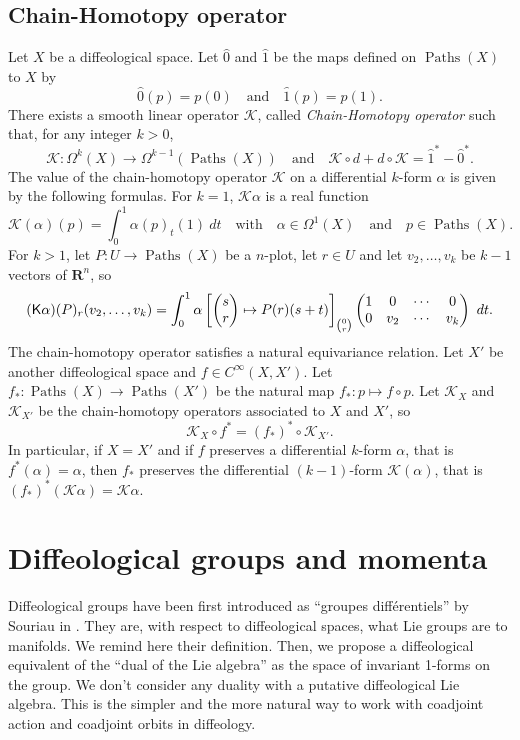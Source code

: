 \documentclass[10pt,reqno,twoside]{amsart}
\newcommand{\qmbox}[1]{\quad\mbox{#1}\quad}
\newcommand{\mymatrix}[1]{\begin{pmatrix} #1 \end{pmatrix}}
\newcommand{\RR}{\mathbf{R}}
\newcommand{\cK}{\mathcal{K}}
\DeclareMathOperator{\Paths}{Paths}
\newcommand{\Cinfty}{C^\infty}
\newcommand{\but}{\hat{1}}
\newcommand{\source}{\hat{0}}
\newcommand{\eK}{\mathbf{\sf K}}
\theoremstyle{plain}
\theoremstyle{definition}
\newcommand{\article}[1]{\subsection{#1}}
\begin{document}
  \article{Chain-Homotopy operator}
  \label{Chain-Homotopy-operator}
  Let $X$ be a diffeological space.
  Let $\source$ and $\but$ be the maps defined on $\Paths(X)$ to $X$ by
  $$\source(p) = p(0) \qmbox{and} \but(p) = p(1).$$
  There exists a smooth linear operator $\cK$,
  called {\em Chain-Homotopy operator} such that,
  for any integer $k>0$,
  $$
    \cK : \Omega^k(X) \to \Omega^{k-1}(\Paths(X))
    \qmbox{and} \cK \circ d + d \circ \cK = \but^* - \source^*.
    $$
  The value of the chain-homotopy operator $\cK$ on a differential $k$-form $\alpha$ is given by the following formulas.
  For $k = 1$,
  $\cK\alpha$ is a real function
  $$
    \cK(\alpha)(p) = \int_0^1 \alpha(p)_t(1) \ dt
    \qmbox{with} \alpha \in \Omega^1(X) \qmbox{and} p \in \Paths(X).
    $$
  For $k>1$,
  let $P : U \to \Paths(X)$ be a $n$-plot,
  let $r \in U$ and let $v_2,\ldots,v_{k}$ be $k-1$ vectors of $\RR^n$,
  so
  $$
    (\eK\alpha)(P)_r(v_2, \ldots,v_{k}) =
    \int_0^1 \alpha \left[ \mymatrix{s \cr r} \mapsto P (r)(s
    + t) \right]_{0 \choose r}\mymatrix{1 & 0 &
    \cdots & 0 \cr 0 & v_2 & \cdots & v_{k}} \
    dt.
    $$
  The chain-homotopy operator satisfies a natural equivariance relation.
  Let $X'$ be another diffeological space and $f \in \Cinfty(X,X')$.
  Let $f_* : \Paths(X) \to \Paths(X')$ be the natural map $f_* : p \mapsto f \circ p$.
  Let $\cK_X$ and $\cK_{X'}$ be the chain-homotopy operators associated to $X$ and $X'$,
  so
  $$
    \cK_X \circ f^* = (f_*)^* \circ \cK_{X'}.
    $$
  In particular,
  if $X = X'$ and if $f$ preserves a differential $k$-form $\alpha$,
  that is $f^*(\alpha) = \alpha$,
  then $f_*$ preserves the differential $(k-1)$-form $\cK(\alpha)$,
  that is $(f_*)^*(\cK\alpha) = \cK\alpha$.
  
  \section{Diffeological groups and momenta}
  
  Diffeological groups have been first introduced as ``groupes différentiels'' by Souriau in \cite{Sou81} \cite{Sou84}.
  They are,
  with respect to diffeological spaces,
  what Lie groups are to manifolds.
  We remind here their definition.
  Then,
  we propose a diffeological equivalent of the ``dual of the Lie algebra'' as the space of invariant 1-forms on the group.
  We don't consider any duality with a putative diffeological Lie algebra.
  This is the simpler and the more natural way to work with coadjoint action and coadjoint orbits in diffeology.
  
\end{document}
